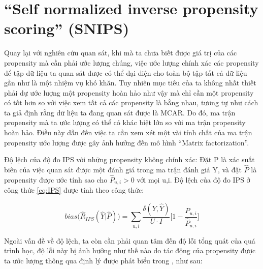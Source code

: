 \section{``Self normalized inverse propensity scoring'' (SNIPS)}

Quay lại với nghiên cứu quan sát, khi mà ta chưa biết được giá trị của các propensity mà cần phải ước lượng chúng, việc ước lượng chính xác các propensity để tập dữ liệu ta quan sát được có thể đại diện cho toàn bộ tập tất cả dữ liệu gần như là một nhiệm vụ khó khăn. Tuy nhiên mục tiêu của ta không nhất thiết phải dự ước lượng một propensity hoàn hảo như vậy mà chỉ cần một propensity có tốt hơn so với việc xem tất cả các propensity là bằng nhau, tương tự như cách ta giả định rằng dữ liệu ta đang quan sát được là MCAR. Do đó, ma trận propensity mà ta ước lượng có thể có khác biệt lớn so với ma trận propensity hoàn hảo. Điều này dẫn đến việc ta cần xem xét một vài tính chất của ma trận propensity ước lượng được gây ảnh hưởng đến mô hình ``Matrix factorization''.

\begin{lemma}
Độ lệch của độ đo IPS với những propensity không chính xác: Đặt P là xác suất biên của việc quan sát được một đánh giá trong ma trận đánh giá Y, và đặt $\hat{P}$ là propensity được ước tính sao cho $\hat{P}_{u,i} > 0$ với mọi u,i. Độ lệch của độ đo IPS ở công thức \ref{eq:IPS} được tính theo công thức:

\begin{equation}
\label{eq:biasips}
bias\bigg (\hat{R}_{IPS}(\hat{Y}|\hat{P}) \bigg) = \sum_{u,i} \frac{\delta(Y, \hat{Y})}{U \cdot I} \Bigg[1-\frac{P_{u,i}}{\hat{P}_{u,i}}\Bigg]
\end{equation}
\end{lemma}

Ngoài vấn đề về độ lệch, ta còn cần phải quan tâm đến độ lỗi tổng quát của quá trình học, độ lỗi này bị ảnh hưởng như thế nào do tác động của propensity được ta ước lượng thông qua định lý được phát biểu trong \cite{IPS}, như sau:

